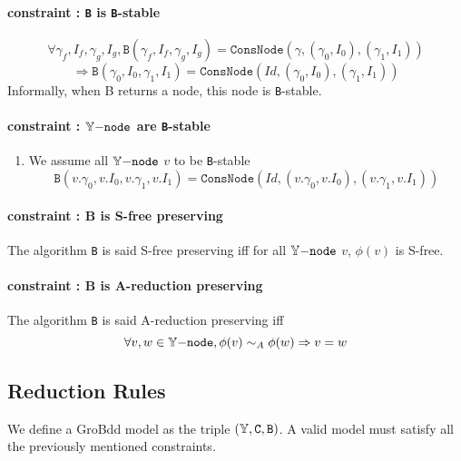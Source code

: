 \documentclass[a4paper,10pt]{article}
\begin{document}
\paragraph{constraint : \texttt{B} is \texttt{B}-stable\\}
\[\forall \gamma_f, I_f, \gamma_g, I_g, \mathtt{B}(\gamma_f, I_f, \gamma_g, I_g) = \mathtt{ConsNode}(\gamma, (\gamma_0, I_0), (\gamma_1, I_1))\]
\[\Rightarrow \mathtt{B}(\gamma_0, I_0, \gamma_1, I_1) = \mathtt{ConsNode}(Id, (\gamma_0, I_0), (\gamma_1, I_1))\]
Informally, when B returns a node, this node is \texttt{B}-stable.

\paragraph{constraint : $\mathbb{Y}\mathtt{-node}$ are \texttt{B}-stable}
\begin{enumerate}
\item We assume all $\mathbb{Y}\mathtt{-node}$ $v$ to be \texttt{B}-stable
\[\mathtt{B}(v.\gamma_0, v.I_0, v.\gamma_1, v.I_1) = \mathtt{ConsNode}(Id, (v.\gamma_0, v.I_0), (v.\gamma_1, v.I_1))\]
\end{enumerate}

\paragraph{constraint : B is S-free preserving\\}
The algorithm \texttt{B} is said S-free preserving iff for all $\mathbb{Y}\mathtt{-node}$ $v$, $\phi(v)$ is S-free.

\paragraph{constraint : B is A-reduction preserving\\}
The algorithm \texttt{B} is said A-reduction preserving iff
\[\forall v, w \in\mathbb{Y}\mathtt{-node}, \phi(v) \sim_A \phi(w) \Rightarrow v = w\]

\subsection{Reduction Rules}
We define a GroBdd model as the triple $(\mathbb{Y}, \mathtt{C}, \mathtt{B})$.
A valid model must satisfy all the previously mentioned constraints.
\end{document}

